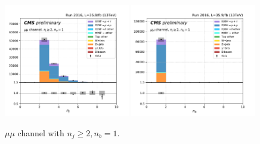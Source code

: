 \begin{figure}[ht]
    \includegraphics[width=0.49\textwidth]{chapters/Analysis/sectionPlots/figures/kinematics_pickles/mumu/1b/mumu_1b_nJets.pdf}
    \includegraphics[width=0.49\textwidth]{chapters/Analysis/sectionPlots/figures/kinematics_pickles/mumu/1b/mumu_1b_nBJets.pdf}
    
    \caption{$\mu \mu$ channel with $n_j\geq2, n_b=1$.}
\end{figure}

